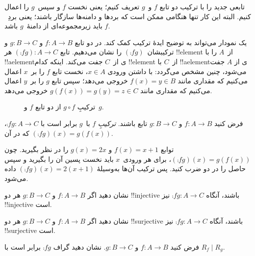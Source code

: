\documentclass[../../../include/open-logic-section]{subfiles}
\begin{document}

\begin{explain}
 تابعی جدید را با
ترکیب دو تابع $f$ و~$g$ تعریف کنیم؛ یعنی نخست
$f$ و سپس~$g$ را اعمال کنیم. البته این کار تنها هنگامی ممکن است که
بردها و دامنه‌ها سازگار باشند؛ یعنی بردِ~$f$ باید زیرمجموعه‌ای از
دامنهٔ~$g$ باشد. 

یک نمودار می‌تواند به توضیح ایدهٔ ترکیب کمک کند. در
 دو تابع $f \colon A \to B$
و $g \colon B \to C$ و ترکیبشان~$(\comp{f}{g})$ را نشان می‌دهیم. تابع
$(\comp{f}{g}) \colon A \to C$ هر !!{element} از~$A$
را با !!a{element}ی از~$C$ جفت می‌کند. اینکه کدام !!{element} از~$C$
با !!a{element}ی از $A$ جفت می‌شود، چنین مشخص می‌گردد: با داشتن ورودی $x \in
A$، نخست تابع $f$ را بر~$x$ اعمال می‌کنیم که مقداری مانند $f(x)
= y \in B$ خروجی می‌دهد؛ سپس تابع $g$ را بر~$y$ اعمال می‌کنیم که مقداری مانند
$g(f(x)) = g(y) = z \in C$ خروجی می‌دهد.
\begin{figure}
  \caption{ترکیبِ $g \circ f$ از دو تابع $f$ و~$g$.}
\end{figure}
\end{explain}

\begin{defn}[ترکیب]
فرض کنید $f\colon A \to B$ و $g\colon B \to C$ تابع باشند.
\emph{ترکیبِ} $f$ با~$g$ برابر است با $\comp{f}{g} \colon A \to C$،
که در آن $(\comp{f}{g})(x) = g(f(x))$.
\end{defn}

\begin{ex}
توابع $f(x) = x + 1$ و $g(x) = 2x$ را در نظر بگیرید. چون
$(\comp{f}{g})(x) = g(f(x))$، برای هر ورودی~$x$ باید نخست
پسین آن را بگیرید و سپس حاصل را در دو ضرب کنید. پس ترکیب آن‌ها
به‌وسیلهٔ $(\comp{f}{g})(x) = 2(x+1)$ داده می‌شود.
\end{ex}

\begin{prob}
نشان دهید اگر $f \colon A \to B$ و $g \colon B \to C$ هر دو
!!{injective} باشند، آنگاه $\comp{f}{g}\colon A \to C$ نیز !!{injective} است.
\end{prob}

\begin{prob}
نشان دهید اگر $f \colon A \to B$ و $g \colon B \to C$ هر دو
!!{surjective} باشند، آنگاه $\comp{f}{g}\colon A \to C$ نیز !!{surjective} است.
\end{prob}

\begin{prob}
فرض کنید $f \colon A \to B$ و $g \colon B \to C$. نشان دهید گراف
$\comp{f}{g}$ برابر است با $R_f \mid R_g$.
\end{prob}
\end{document}
